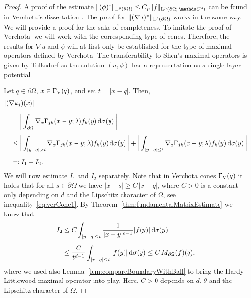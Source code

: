 \begin{proof}
  A proof of the estimate $\|(\phi)^*\|_{\Ell^p(\partial\Omega)} \leq C_p \|f\|_{\Ell^p(\partial\Omega; \,\C^d)}$ can be found in Verchota's dissertation \cite[Lem.\@~1.3]{verchota}.
  The proof for $\|(\nabla u)^*\|_{\mathrm{L}^p(\partial\Omega)}$ works in the same way. 
  We will provide a proof for the sake of completeness.
  To imitate the proof of Verchota, we will work with the corresponding type of cones.
  Therefore, the results for $\nabla u$ and $\phi$ will at first only be established for the type of maximal operators defined by Verchota.
  The transferability to Shen's maximal operators is given by Tolksdorf \cite[p.\@~90ff.]{tolksdorf} as the solution $(u,\phi)$ has a representation as a single layer potential.

  Let $q \in \partial\Omega$,  $x \in \Gamma_\mathrm{V}(q)$, and set $t = |x - q|$.
  Then,
  \begin{align*}
    &|(\nabla u_j)(x) | \\[0.5em]
    &\quad= \bigg| \int_{\partial\Omega} \nabla_x \Gamma_{jk} (x - y; \lambda) f_k(y) \, {\operatorname{d}\!{\sigma}}(y)\, \bigg| \\[0.5em]
    &\quad\leq \bigg| \int_{|y - q| > t} \nabla_x\Gamma_{jk}(x - y; \lambda) f_k(y) \, {\operatorname{d}\!{\sigma}}(y) \, \bigg| + \bigg| \int_{|y - q| \leq t} \nabla_x \Gamma_{jk}(x - y; \lambda) f_k(y) \, {\operatorname{d}\!{\sigma}}(y)\, \bigg| \\[0.5em]
    &\quad\eqqcolon I_1 + I_2.
  \end{align*}
  We will now estimate $I_1$ and $I_2$ separately.
  Note that in Verchota cones $\Gamma_\mathrm{V}(q)$ it holds that for all $s \in \partial\Omega$ we have $|x - s| \geq C\, |x - q|$, where $C > 0$ is a constant only depending on $d$ and the Lipschitz character of $\Omega$, see inequality~\eqref{eq:verCone1}.
  By Theorem~\ref{thm:fundamentalMatrixEstimate} we know that
  \begin{align*}
    I_2 
    &\leq C \int_{|y - q| \leq t} \frac{1}{|x - y|^{d - 1}} |f(y)| \, {\operatorname{d}\!{\sigma}}(y) \\[0.5em]
    &\leq \frac{C}{t^{d - 1}} \int_{|y - q| \leq t} |f(y)| \, {\operatorname{d}\!{\sigma}}(y)
    \leq C\, M_{\partial\Omega} (f)(q),
  \end{align*}
  where we used also Lemma~\ref{lem:compareBoundaryWithBall} to bring the Hardy-Littlewood maximal operator into play.
  Here, $C > 0$ depends on $d$, $\theta$ and the Lipschitz character of $\Omega$.

\end{proof}
